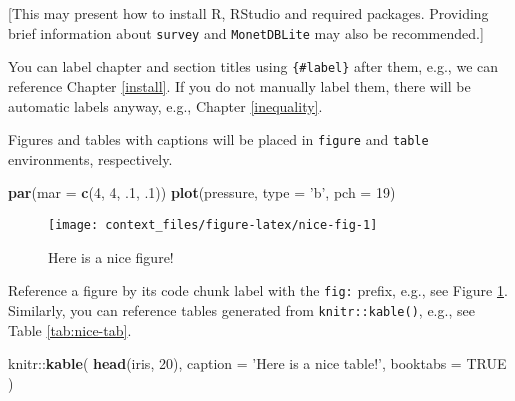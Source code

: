 \documentclass[]{book}
\newenvironment{Shaded}{\begin{snugshade}}{\end{snugshade}}
\newcommand{\KeywordTok}[1]{\textcolor[rgb]{0.13,0.29,0.53}{\textbf{{#1}}}}
\newcommand{\DataTypeTok}[1]{\textcolor[rgb]{0.13,0.29,0.53}{{#1}}}
\newcommand{\DecValTok}[1]{\textcolor[rgb]{0.00,0.00,0.81}{{#1}}}
\newcommand{\StringTok}[1]{\textcolor[rgb]{0.31,0.60,0.02}{{#1}}}
\newcommand{\OtherTok}[1]{\textcolor[rgb]{0.56,0.35,0.01}{{#1}}}
\newcommand{\NormalTok}[1]{{#1}}
\begin{document}
{[}This may present how to install R, RStudio and required packages.
Providing brief information about \texttt{survey} and
\texttt{MonetDBLite} may also be recommended.{]}

You can label chapter and section titles using \texttt{\{\#label\}}
after them, e.g., we can reference Chapter \ref{install}. If you do not
manually label them, there will be automatic labels anyway, e.g.,
Chapter \ref{inequality}.

Figures and tables with captions will be placed in \texttt{figure} and
\texttt{table} environments, respectively.

\begin{Shaded}
\begin{Highlighting}[]
\KeywordTok{par}\NormalTok{(}\DataTypeTok{mar =} \KeywordTok{c}\NormalTok{(}\DecValTok{4}\NormalTok{, }\DecValTok{4}\NormalTok{, .}\DecValTok{1}\NormalTok{, .}\DecValTok{1}\NormalTok{))}
\KeywordTok{plot}\NormalTok{(pressure, }\DataTypeTok{type =} \StringTok{'b'}\NormalTok{, }\DataTypeTok{pch =} \DecValTok{19}\NormalTok{)}
\end{Highlighting}
\end{Shaded}

\begin{figure}

{\centering \texttt{[image: context\_files/figure-latex/nice-fig-1]} 

}

\caption{Here is a nice figure!}\label{fig:nice-fig}
\end{figure}

Reference a figure by its code chunk label with the \texttt{fig:}
prefix, e.g., see Figure \ref{fig:nice-fig}. Similarly, you can
reference tables generated from \texttt{knitr::kable()}, e.g., see Table
\ref{tab:nice-tab}.

\begin{Shaded}
\begin{Highlighting}[]
\NormalTok{knitr::}\KeywordTok{kable}\NormalTok{(}
  \KeywordTok{head}\NormalTok{(iris, }\DecValTok{20}\NormalTok{), }\DataTypeTok{caption =} \StringTok{'Here is a nice table!'}\NormalTok{,}
  \DataTypeTok{booktabs =} \OtherTok{TRUE}
\NormalTok{)}
\end{Highlighting}
\end{Shaded}
\end{document}

